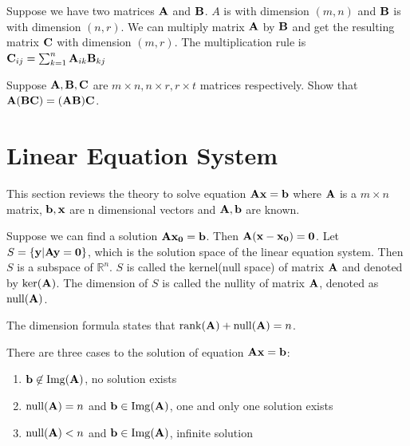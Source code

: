 Suppose we have two matrices $\mathbf{A}$ and $\mathbf{B}$.  $A$ is with dimension $(m,n)$ and $\mathbf{B}$ is with dimension $(n,r)$. We can multiply matrix $\mathbf{A}$ by $\mathbf{B}$ and get the resulting matrix $\mathbf{C}$ with dimension $(m, r)$. The multiplication rule is $\mathbf{C}_{ij} = \sum_{k=1}^n \mathbf{A}_{ik}\mathbf{B}_{kj}$

\begin{exercise}
Suppose $\mathbf{A}, \mathbf{B}, \mathbf{C}$ are $m\times n, n\times r, r \times t$ matrices respectively.	Show that $\mathbf{A}(\mathbf{B}\mathbf{C}) = (\mathbf{A}\mathbf{B})\mathbf{C}$.
\end{exercise}


\section{Linear Equation System}
This section reviews the theory to solve equation $\mathbf{A}\mathbf{x}=\mathbf{b}$ where $\mathbf{A}$ is a $m \times n$ matrix, $\mathbf{b}, \mathbf{x}$ are n dimensional vectors and $\mathbf{A}, \mathbf{b}$ are known.

Suppose we can find a solution $\mathbf{A}\mathbf{x_0} = \mathbf{b}$. Then $\mathbf{A}(\mathbf{x}-\mathbf{x_0})=\mathbf{0}$. Let $S = \{\mathbf{y} | \mathbf{A}\mathbf{y}=\mathbf{0}\}$, which is the solution space of the linear equation system. Then $S$ is a subspace of $\mathbb{R}^n$. $S$ is called the kernel(null space) of matrix $\mathbf{A}$ and denoted by $\mathrm{ker}(\mathbf{A})$. The dimension of $S$ is called the nullity of matrix $\mathbf{A}$, denoted as $\mathrm{null}(\mathbf{A})$.

The dimension formula states that $\mathrm{rank}(\mathbf{A}) + \mathrm{null}(\mathbf{A}) = n$.

There are three cases to the solution of equation $\mathbf{A}\mathbf{x}=\mathbf{b}$:
\begin{enumerate}
\item $\mathbf{b} \not\in \mathrm{Img}(\mathbf{A})$, no solution exists
\item $\mathrm{null}(\mathbf{A}) = n$ and $\mathbf{b} \in \mathrm{Img}(\mathbf{A})$, one and only one solution exists
\item $\mathrm{null}(\mathbf{A}) < n$ and $\mathbf{b} \in \mathrm{Img}(\mathbf{A})$, infinite solution
\end{enumerate}